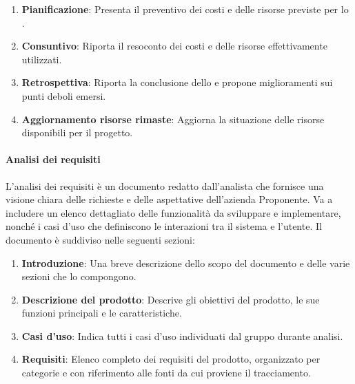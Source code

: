 \begin{itemize}
\begin{enumerate}
        \item \textbf{Pianificazione}: Presenta il preventivo dei costi e delle risorse previste per lo .
        \item \textbf{Consuntivo}: Riporta il resoconto dei costi e delle risorse effettivamente utilizzati.
        \item \textbf{Retrospettiva}: Riporta la conclusione dello  e propone miglioramenti sui punti deboli emersi.
        \item \textbf{Aggiornamento risorse rimaste}: Aggiorna la situazione delle risorse disponibili per il progetto.
    \end{enumerate}
\end{itemize}

\paragraph{Analisi dei requisiti}
L’analisi dei requisiti è un documento redatto dall’analista che fornisce una visione chiara delle richieste e delle aspettative dell’azienda Proponente. Va a includere un elenco dettagliato delle funzionalità da sviluppare e implementare, nonché i casi d’uso che definiscono le interazioni tra il sistema e l’utente.
Il documento è suddiviso nelle seguenti sezioni:
\begin{enumerate}
    \item \textbf{Introduzione}: Una breve descrizione dello scopo del documento e delle varie sezioni che lo compongono.
    \item \textbf{Descrizione del prodotto}: Descrive gli obiettivi del prodotto, le sue funzioni principali e le caratteristiche.
    \item \textbf{Casi d’uso}: Indica tutti i casi d’uso individuati dal gruppo durante analisi.
    \item \textbf{Requisiti}: Elenco completo dei requisiti del prodotto, organizzato per categorie e con riferimento alle fonti da cui proviene il tracciamento.
\end{enumerate}


